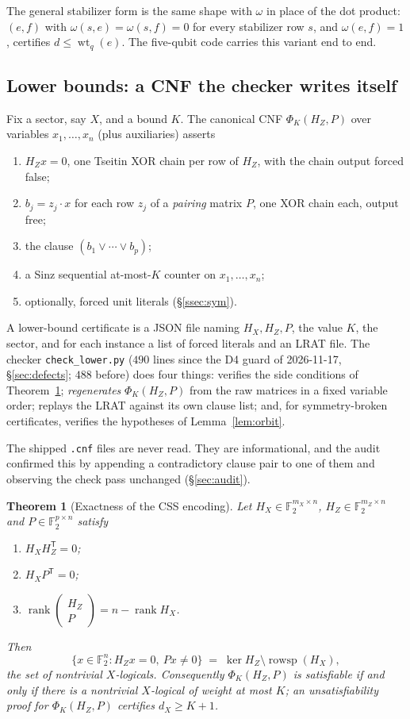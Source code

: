 \documentclass[11pt]{amsart}
\newcommand{\FF}{\mathbb{F}_{2}}
\newcommand{\rowsp}{\operatorname{rowsp}}
\newcommand{\rank}{\operatorname{rank}}
\newcommand{\wt}{\operatorname{wt}}
\newcommand{\HX}{H_{X}}
\newcommand{\HZ}{H_{Z}}
\newcommand{\dX}{d_{X}}
\theoremstyle{plain}
\newtheorem{theorem}{Theorem}[section]
\theoremstyle{definition}
\theoremstyle{remark}
\begin{document}
The general stabilizer form is the same shape with $\omega$ in place of the
dot product: $(e,f)$ with $\omega(s,e)=\omega(s,f)=0$ for every stabilizer row
$s$, and $\omega(e,f)=1$, certifies $d\le\wt_{q}(e)$. The five-qubit code
carries this variant end to end.

\subsection{Lower bounds: a CNF the checker writes itself}\label{ssec:lower}
Fix a sector, say $X$, and a bound $K$. The canonical CNF
$\Phi_{K}(\HZ,P)$ over variables $x_{1},\dots,x_{n}$ (plus auxiliaries)
asserts
\begin{enumerate}
\item[(1)] $\HZ x=0$, one Tseitin XOR chain per row of $\HZ$, with the chain
output forced false;
\item[(2)] $b_{j}=z_{j}\cdot x$ for each row $z_{j}$ of a \emph{pairing}
matrix $P$, one XOR chain each, output free;
\item[(3)] the clause $(b_{1}\vee\cdots\vee b_{p})$;
\item[(4)] a Sinz sequential at-most-$K$ counter \cite{Sinz05} on
$x_{1},\dots,x_{n}$;
\item[(5)] optionally, forced unit literals (\S\ref{ssec:sym}).
\end{enumerate}
A lower-bound certificate is a JSON file naming $\HX,\HZ,P$, the value $K$,
the sector, and for each instance a list of forced literals and an LRAT file.
The checker \texttt{check\_lower.py} ($490$ lines since the D4 guard of
2026-11-17, \S\ref{sec:defects}; $488$ before) does four things: verifies
the side conditions of Theorem~\ref{thm:exact}; \emph{regenerates}
$\Phi_{K}(\HZ,P)$ from the raw matrices in a fixed variable order; replays the
LRAT against its own clause list; and, for symmetry-broken certificates,
verifies the hypotheses of Lemma~\ref{lem:orbit}.

The shipped \texttt{.cnf} files are never read. They are informational, and the
audit confirmed this by appending a contradictory clause pair to one of them
and observing the check pass unchanged (\S\ref{sec:audit}).

\begin{theorem}[Exactness of the CSS encoding]\label{thm:exact}
Let $\HX\in\FF^{m_{X}\times n}$, $\HZ\in\FF^{m_{Z}\times n}$ and
$P\in\FF^{p\times n}$ satisfy
\begin{enumerate}
\item[(a)] $\HX\HZ^{\mathsf T}=0$;
\item[(b)] $\HX P^{\mathsf T}=0$;
\item[(c)] $\rank\begin{pmatrix}\HZ\\P\end{pmatrix}=n-\rank\HX$.
\end{enumerate}
Then
\[
  \{x\in\FF^{n}: \HZ x=0,\ Px\ne 0\}
  \;=\;\ker\HZ\setminus\rowsp(\HX),
\]
the set of nontrivial $X$-logicals. Consequently $\Phi_{K}(\HZ,P)$ is
satisfiable if and only if there is a nontrivial $X$-logical of weight at most
$K$; an unsatisfiability proof for $\Phi_{K}(\HZ,P)$ certifies $\dX\ge K+1$.
\end{theorem}
\end{document}
